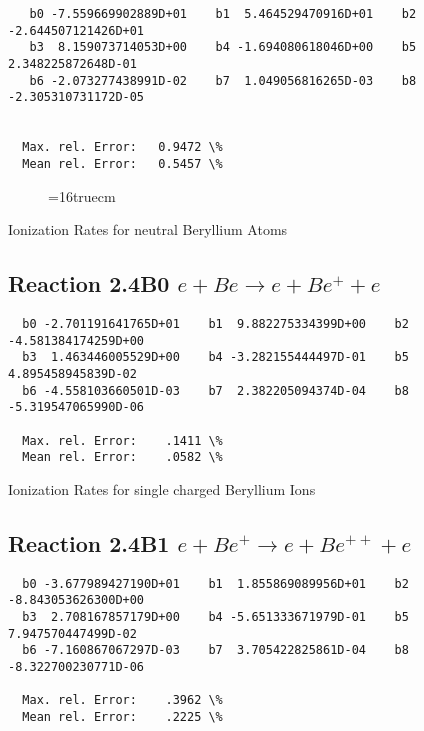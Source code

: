 \documentclass[12pt,dvipdfmx]{article}
\begin{document}
\begin{small}\begin{verbatim}
   b0 -7.559669902889D+01    b1  5.464529470916D+01    b2 -2.644507121426D+01
   b3  8.159073714053D+00    b4 -1.694080618046D+00    b5  2.348225872648D-01
   b6 -2.073277438991D-02    b7  1.049056816265D-03    b8 -2.305310731172D-05


  Max. rel. Error:   0.9472 \%
  Mean rel. Error:   0.5457 \%

\end{verbatim}\end{small}

\begin{figure} \label{2.2B}
\epsfxsize=16truecm
\end{figure}
\newpage

 Ionization Rates for neutral Beryllium Atoms

\subsection{
Reaction 2.4B0   $e + Be \rightarrow e + Be^+ + e $
}

\begin{small}\begin{verbatim}
  b0 -2.701191641765D+01    b1  9.882275334399D+00    b2 -4.581384174259D+00
  b3  1.463446005529D+00    b4 -3.282155444497D-01    b5  4.895458945839D-02
  b6 -4.558103660501D-03    b7  2.382205094374D-04    b8 -5.319547065990D-06

  Max. rel. Error:    .1411 \%
  Mean rel. Error:    .0582 \%

\end{verbatim}\end{small}

 Ionization Rates for
 single charged Beryllium Ions

\subsection{
Reaction 2.4B1  $e + Be^+ \rightarrow e + Be^{++} + e $
}


\begin{small}\begin{verbatim}
  b0 -3.677989427190D+01    b1  1.855869089956D+01    b2 -8.843053626300D+00
  b3  2.708167857179D+00    b4 -5.651333671979D-01    b5  7.947570447499D-02
  b6 -7.160867067297D-03    b7  3.705422825861D-04    b8 -8.322700230771D-06

  Max. rel. Error:    .3962 \%
  Mean rel. Error:    .2225 \%

\end{verbatim}\end{small}
\end{document}
